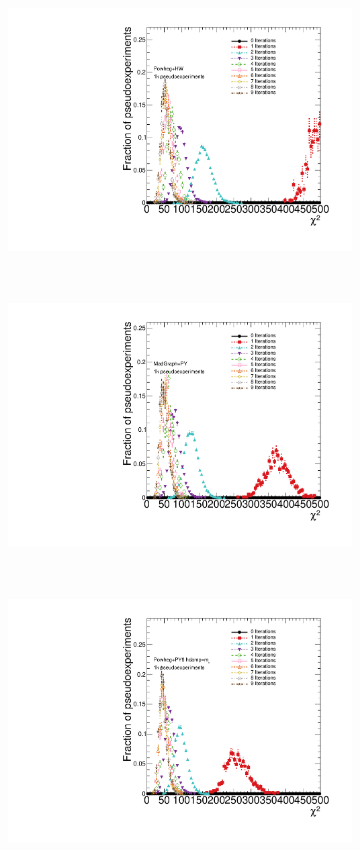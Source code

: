 \begin{figure}
\begin{subfigure}[]{0.45\textwidth}
\includegraphics[width=\textwidth]{fig/Stress/105860atlfast/AvgChi2.pdf}
\end{subfigure}
~
\begin{subfigure}[]{0.45\textwidth}
\includegraphics[width=\textwidth]{fig/Stress/110872atlfast/AvgChi2.pdf}
\end{subfigure}
\\
\begin{subfigure}[]{0.45\textwidth}
\includegraphics[width=\textwidth]{fig/Stress/110404atlfast/AvgChi2.pdf}

\end{subfigure}
\end{figure}
